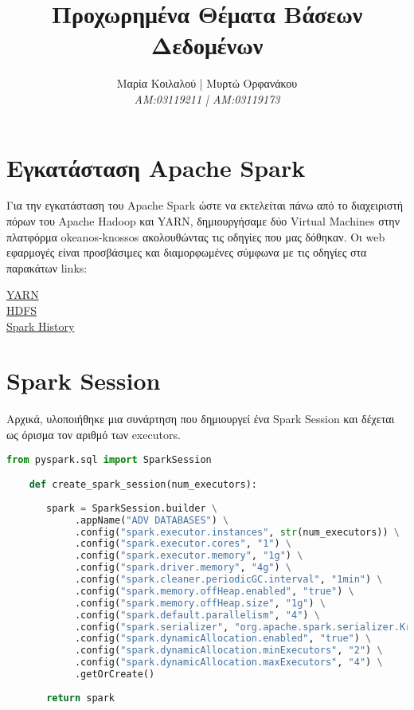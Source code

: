 \documentclass{article}
\title{Προχωρημένα Θέματα Βάσεων Δεδομένων}
\author{Μαρία Κοιλαλού | Μυρτώ Ορφανάκου\\
\textit{AM:03119211 | ΑM:03119173}}
\begin{document}
\maketitle

\vspace{3\baselineskip}

\section{Εγκατάσταση Apache Spark}
Για την εγκατάσταση του Apache Spark ώστε να εκτελείται πάνω από το διαχειριστή πόρων του Apache Hadoop και YARN,
δημιουργήσαμε δύο Virtual Machines στην πλατφόρμα okeanos-knossos ακολουθώντας τις οδηγίες που μας δόθηκαν.
Οι web εφαρμογές είναι προσβάσιμες και διαμορφωμένες σύμφωνα με τις οδηγίες στα παρακάτων links: 

\begin{center}
\href{http://83.212.81.191:8088}{YARN} \\
\href{http://83.212.81.191:9870}{HDFS} \\
\href{http://83.212.81.191:18080}{Spark History} \\
\end{center}


\section*{Spark Session}

Αρχικά, υλοποιήθηκε μια συνάρτηση που δημιουργεί ένα Spark Session και δέχεται ως όρισμα τον αριθμό των executors.

\begin{lstlisting}[language = Python]
    from pyspark.sql import SparkSession

    def create_spark_session(num_executors):
       
       spark = SparkSession.builder \
            .appName("ADV DATABASES") \
            .config("spark.executor.instances", str(num_executors)) \
            .config("spark.executor.cores", "1") \
            .config("spark.executor.memory", "1g") \
            .config("spark.driver.memory", "4g") \
            .config("spark.cleaner.periodicGC.interval", "1min") \
            .config("spark.memory.offHeap.enabled", "true") \
            .config("spark.memory.offHeap.size", "1g") \
            .config("spark.default.parallelism", "4") \
            .config("spark.serializer", "org.apache.spark.serializer.KryoSerializer") \
            .config("spark.dynamicAllocation.enabled", "true") \
            .config("spark.dynamicAllocation.minExecutors", "2") \
            .config("spark.dynamicAllocation.maxExecutors", "4") \
            .getOrCreate()
          
       return spark
\end{lstlisting}
\end{document}
